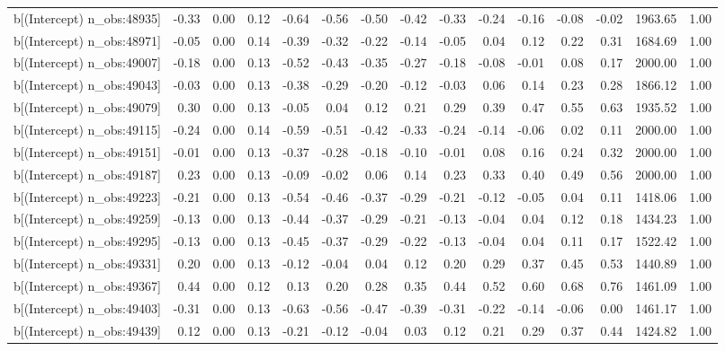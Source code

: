 \begin{table}[ht]
\begin{tabular}{rrrrrrrrrrrrrrr}
  b[(Intercept) n\_obs:48935] & -0.33 & 0.00 & 0.12 & -0.64 & -0.56 & -0.50 & -0.42 & -0.33 & -0.24 & -0.16 & -0.08 & -0.02 & 1963.65 & 1.00 \\ 
  b[(Intercept) n\_obs:48971] & -0.05 & 0.00 & 0.14 & -0.39 & -0.32 & -0.22 & -0.14 & -0.05 & 0.04 & 0.12 & 0.22 & 0.31 & 1684.69 & 1.00 \\ 
  b[(Intercept) n\_obs:49007] & -0.18 & 0.00 & 0.13 & -0.52 & -0.43 & -0.35 & -0.27 & -0.18 & -0.08 & -0.01 & 0.08 & 0.17 & 2000.00 & 1.00 \\ 
  b[(Intercept) n\_obs:49043] & -0.03 & 0.00 & 0.13 & -0.38 & -0.29 & -0.20 & -0.12 & -0.03 & 0.06 & 0.14 & 0.23 & 0.28 & 1866.12 & 1.00 \\ 
  b[(Intercept) n\_obs:49079] & 0.30 & 0.00 & 0.13 & -0.05 & 0.04 & 0.12 & 0.21 & 0.29 & 0.39 & 0.47 & 0.55 & 0.63 & 1935.52 & 1.00 \\ 
  b[(Intercept) n\_obs:49115] & -0.24 & 0.00 & 0.14 & -0.59 & -0.51 & -0.42 & -0.33 & -0.24 & -0.14 & -0.06 & 0.02 & 0.11 & 2000.00 & 1.00 \\ 
  b[(Intercept) n\_obs:49151] & -0.01 & 0.00 & 0.13 & -0.37 & -0.28 & -0.18 & -0.10 & -0.01 & 0.08 & 0.16 & 0.24 & 0.32 & 2000.00 & 1.00 \\ 
  b[(Intercept) n\_obs:49187] & 0.23 & 0.00 & 0.13 & -0.09 & -0.02 & 0.06 & 0.14 & 0.23 & 0.33 & 0.40 & 0.49 & 0.56 & 2000.00 & 1.00 \\ 
  b[(Intercept) n\_obs:49223] & -0.21 & 0.00 & 0.13 & -0.54 & -0.46 & -0.37 & -0.29 & -0.21 & -0.12 & -0.05 & 0.04 & 0.11 & 1418.06 & 1.00 \\ 
  b[(Intercept) n\_obs:49259] & -0.13 & 0.00 & 0.13 & -0.44 & -0.37 & -0.29 & -0.21 & -0.13 & -0.04 & 0.04 & 0.12 & 0.18 & 1434.23 & 1.00 \\ 
  b[(Intercept) n\_obs:49295] & -0.13 & 0.00 & 0.13 & -0.45 & -0.37 & -0.29 & -0.22 & -0.13 & -0.04 & 0.04 & 0.11 & 0.17 & 1522.42 & 1.00 \\ 
  b[(Intercept) n\_obs:49331] & 0.20 & 0.00 & 0.13 & -0.12 & -0.04 & 0.04 & 0.12 & 0.20 & 0.29 & 0.37 & 0.45 & 0.53 & 1440.89 & 1.00 \\ 
  b[(Intercept) n\_obs:49367] & 0.44 & 0.00 & 0.12 & 0.13 & 0.20 & 0.28 & 0.35 & 0.44 & 0.52 & 0.60 & 0.68 & 0.76 & 1461.09 & 1.00 \\ 
  b[(Intercept) n\_obs:49403] & -0.31 & 0.00 & 0.13 & -0.63 & -0.56 & -0.47 & -0.39 & -0.31 & -0.22 & -0.14 & -0.06 & 0.00 & 1461.17 & 1.00 \\ 
  b[(Intercept) n\_obs:49439] & 0.12 & 0.00 & 0.13 & -0.21 & -0.12 & -0.04 & 0.03 & 0.12 & 0.21 & 0.29 & 0.37 & 0.44 & 1424.82 & 1.00 \\ 

\end{tabular}
\end{table}
